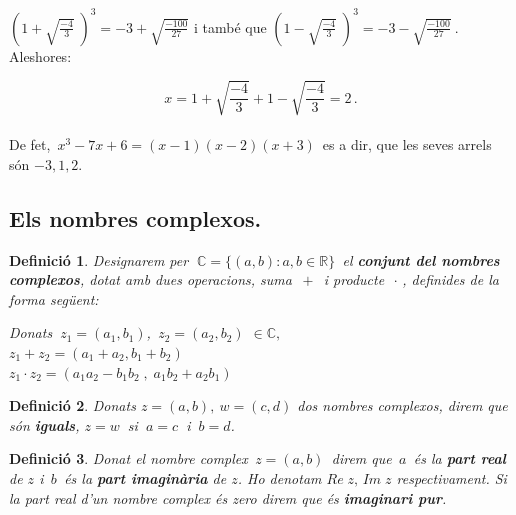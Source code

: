 \documentclass[12pt]{article}
\newtheorem{definicio}{Definici{\'o}}[subsection]
\newcommand{\R}{\mathbb{R}}
\newcommand{\C}{\mathbb{C}}
\begin{document}
$\left(1+\sqrt{\frac{-4}{3}}\;\right)^{3}=-3+\sqrt{\frac{-100}{27}}$\hspace{1cm}
i tamb{\'e} que \hspace{1cm}$\left(1-\sqrt{\frac{-4}{3}}\;\right)^{3}=-3-\sqrt{\frac{-100}{27}}\ $.\\

Aleshores:

$$x=1+\sqrt{\frac{-4}{3}}+1-\sqrt{\frac{-4}{3}}=2\, .$$\\

De fet, $\,x^{3}-7x+6=(x-1)(x-2)(x+3)\,$ es a dir, que les seves
arrels s{\'o}n $-3,1,2$.


\subsection{Els nombres complexos.}


\begin{definicio}

 Designarem per $\; \C=\{(a,b) : a,b\in \R\}\,$ el \textbf{conjunt del nombres
 complexos}, dotat amb dues operacions, suma $\,+\,$ i producte
 $\,\cdot\,$, definides de la forma seg{\"u}ent:

\hspace{1.5cm}Donats $\ z_{1}=(a_{1},b_{1})$, $\,z_{2}=(a_{2},b_{2})$ $\in \C,$\\

\hspace{1.5cm}$z_{1}+z_{2}=(a_{1}+a_{2},b_{1}+b_{2})$\\

\hspace{1.5cm}$z_{1}\cdot z_{2}=(a_{1}a_{2}-b_{1}b_{2}\; ,\;
a_{1}b_{2}+a_{2}b_{1})$

\end{definicio}

\begin{definicio}

 Donats $z=(a,b),\ w=(c,d)$ dos nombres complexos, direm que
s{\'o}n \textbf{iguals}, $z=w\  $ si $\  a=c\ $ i $\ b=d$.

\end{definicio}

\begin{definicio}

Donat el nombre complex $\, z=(a,b)\,$ direm que  $\,a\,$ \'{e}s la
\textbf{part real} de $z$ i $\,b\,$ \'{e}s la \textbf{part
imagin\`{a}ria} de $z$. Ho denotam $Re\; z,\, Im\; z$
respectivament.
 Si la part real d'un nombre complex \'{e}s zero direm que \'{e}s
\textbf{imaginari pur}.

\end{definicio}
\end{document}
